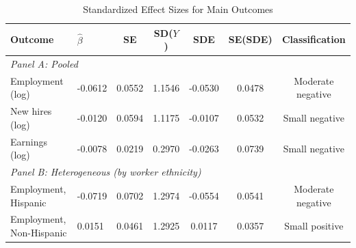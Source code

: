 \begin{table}[H]
\centering
\caption{Standardized Effect Sizes for Main Outcomes}
\label{tab:sde}
\begin{threeparttable}
\footnotesize
\begin{tabular}{llccccc}
\toprule
Outcome & $\hat{\beta}$ & SE & SD($Y$) & SDE & SE(SDE) & Classification \\
\midrule
\multicolumn{7}{l}{\textit{Panel A: Pooled}} \\
Employment (log) & -0.0612 & 0.0552 & 1.1546 & -0.0530 & 0.0478 & Moderate negative \\
New hires (log) & -0.0120 & 0.0594 & 1.1175 & -0.0107 & 0.0532 & Small negative \\
Earnings (log) & -0.0078 & 0.0219 & 0.2970 & -0.0263 & 0.0739 & Small negative \\
\midrule
\multicolumn{7}{l}{\textit{Panel B: Heterogeneous (by worker ethnicity)}} \\
Employment, Hispanic & -0.0719 & 0.0702 & 1.2974 & -0.0554 & 0.0541 & Moderate negative \\
Employment, Non-Hispanic & 0.0151 & 0.0461 & 1.2925 & 0.0117 & 0.0357 & Small positive \\
\bottomrule
\end{tabular}
\begin{tablenotes}[flushleft]
\scriptsize

\end{tablenotes}
\end{threeparttable}
\end{table}

